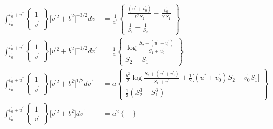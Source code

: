 \documentclass[letterpaper]{article}
\begin{document}
\begin{subequations}
\begin{align}
 \int_{v_0^\prime}^{v_0^\prime + u^\prime} 
  \left\{ \begin{array}{c}  1 \\ v^\prime \end{array} \right\}
  \Big[v^{\prime 2} + b^2\Big]^{-3/2}d v^\prime
&= \frac{1}{a^3} 
   \left\{ \begin{array}{c}
    \frac{(u^\prime + v_0^\prime)}{b^2 S_2} - \frac{v_0^\prime}{b^2 S_1} 
    \\[5pt]
    \frac{1}{S_1} - \frac{1}{S_2}
   \end{array}\right\}
\\[5pt]
 \int_{v_0^\prime}^{v_0^\prime + u^\prime} 
  \left\{ \begin{array}{c}  1 \\ v^\prime \end{array} \right\}
  \Big[v^{\prime 2} + b^2\Big]^{-1/2}d v^\prime
&= \frac{1}{a} 
   \left\{ \begin{array}{c}
    \log \frac{ S_2 + (u^\prime+v_0^\prime) }
              { S_1 + v_0^\prime }
    \\[5pt]
    S_2 - S_1
   \end{array}\right\}
\\[8pt]
 \int_{v_0^\prime}^{v_0^\prime + u^\prime} 
  \left\{ \begin{array}{c}  1 \\ v^\prime \end{array} \right\}
  \Big[v^{\prime 2} + b^2\Big]^{1/2} d v^\prime
&= a
   \left\{ \begin{array}{c}
   \frac{b^2}{2} \log \frac{ S_2 + (u^\prime+v_0^\prime) }
                           { S_1 + v_0^\prime }
   +\frac{1}{2}\big[(u^\prime + v_0^\prime)S_2 - v_0^\prime S_1\big]
   \\[5pt]
   \frac{1}{3}(S_2^3 - S_1^3)
   \end{array}\right\}
\\[8pt]
 \int_{v_0^\prime}^{v_0^\prime + u^\prime} 
  \left\{ \begin{array}{c}  1 \\ v^\prime \end{array} \right\}
  \Big[v^{\prime 2} + b^2\Big]d v^\prime
&= a^2
   \left\{ \begin{array}{c}
    \\[5pt]
   \end{array}\right\}
\end{align}
\label{vPrimeIntegrals}
\end{subequations}
\end{document}
